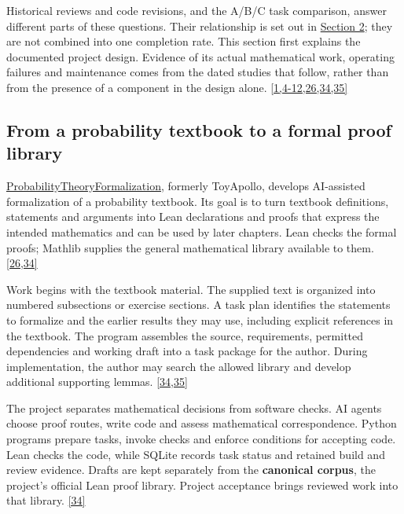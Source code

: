 Historical reviews and code revisions, and the A/B/C task comparison, answer different parts of these questions. Their relationship is set out in \hyperlink{section-2}{Section 2}; they are not combined into one completion rate. This section first explains the documented project design. Evidence of its actual mathematical work, operating failures and maintenance comes from the dated studies that follow, rather than from the presence of a component in the design alone. \hyperlink{ref-1}{\mbox{[1,4-12,26,34,35]}}

\subsection[From a probability textbook to a formal proof library]{\texorpdfstring{\protect\hypertarget{section-1-1}{}From a probability textbook to a formal proof library}{From a probability textbook to a formal proof library}}
\href{https://github.com/Kind-NK-Hill/ProbabilityTheoryFormalization}{ProbabilityTheoryFormalization}, formerly ToyApollo, develops AI-assisted formalization of a probability textbook. Its goal is to turn textbook definitions, statements and arguments into Lean declarations and proofs that express the intended mathematics and can be used by later chapters. Lean checks the formal proofs; Mathlib supplies the general mathematical library available to them. \hyperlink{ref-26}{\mbox{[26,34]}}

Work begins with the textbook material. The supplied text is organized into numbered subsections or exercise sections. A task plan identifies the statements to formalize and the earlier results they may use, including explicit references in the textbook. The program assembles the source, requirements, permitted dependencies and working draft into a task package for the author. During implementation, the author may search the allowed library and develop additional supporting lemmas. \hyperlink{ref-34}{\mbox{[34,35]}}

The project separates mathematical decisions from software checks. AI agents choose proof routes, write code and assess mathematical correspondence. Python programs prepare tasks, invoke checks and enforce conditions for accepting code. Lean checks the code, while SQLite records task status and retained build and review evidence. Drafts are kept separately from the \textbf{canonical corpus}, the project's official Lean proof library. Project acceptance brings reviewed work into that library. \hyperlink{ref-34}{\mbox{[34]}}

